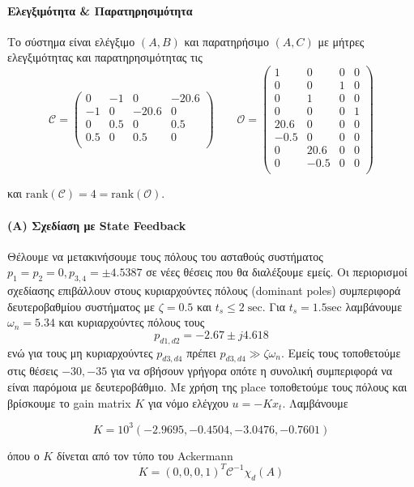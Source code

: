 \documentclass[a4paper,oneside, 12pt]{article}
\begin{document}
\paragraph{Ελεγξιμότητα \& Παρατηρησιμότητα} Το σύστημα είναι ελέγξιμο $(A,B)$ και παρατηρήσιμο $(A, C)$ με μήτρες ελεγξιμότητας και παρατηρησιμότητας τις 
$$ 
\mathcal C = 
\begin{pmatrix}
0 & -1&0& -20.6 \\
-1 &0& -20.6 &	0 \\
0 & 0.5 & 0 & 0.5 \\
0.5 & 0 & 0.5 & 0 \\
\end{pmatrix}
\qquad \mathcal O =
\begin{pmatrix}
1& 	0&	0&	0 \\
0&	0&	1&	0 \\
0&	1&	0&	0 \\
0&	0&	0&	1 \\
20.6&	0&	0&	0 \\
-0.5&	0&	0&	0 \\
0&	20.6&	0&	0 \\
0&	-0.5&	0&	0 \\
\end{pmatrix}
$$

και $\mathrm {rank} (\mathcal C) = 4 = \mathrm{rank}(\mathcal O)$. 

\paragraph{(Α) Σχεδίαση με State Feedback} Θέλουμε να μετακινήσουμε τους πόλους του ασταθούς συστήματος $p_1 = p_2 = 0, p_{3,4} = \pm 4.5387$ σε νέες θέσεις που θα διαλέξουμε εμείς. Οι περιορισμοί σχεδίασης επιβάλλουν στους κυριαρχούντες πόλους (dominant poles) συμπεριφορά δευτεροβαθμίου συστήματος με $\zeta = 0.5$ και $t_s \le 2 \mathrm {\; sec}$. Για $t_s = 1.5 \mathrm {sec}$ λαμβάνουμε $\omega_n = 5.34$ και κυριαρχούντες πόλους τους $$p_{d1, d2} = -2.67 \pm j 4.618$$ ενώ για τους μη κυριαρχούντες $p_{d3, d4}$ πρέπει $p_{d3, d4} \gg \zeta \omega_n$. Εμείς τους τοποθετούμε στις θέσεις $-30, -35$ για να σβήσουν γρήγορα οπότε η συνολική συμπεριφορά να είναι παρόμοια με δευτεροβάθμιο. Με χρήση της place τοποθετούμε τους πόλους και βρίσκουμε το gain matrix $K$ για νόμο ελέγχου $u = -K x_t$. Λαμβάνουμε 

$$K = 10^3 (-2.9695,   -0.4504,   -3.0476,   -0.7601)$$

όπου ο $K$ δίνεται από τον τύπο του Ackermann $$K = (0, 0,0, 1)^T \mathcal C^{-1} \chi_d(A)$$
\end{document}
